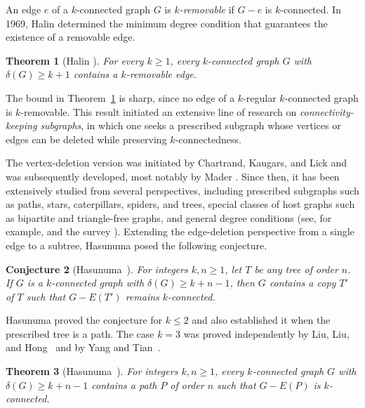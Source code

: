 \documentclass[11pt]{article}
\numberwithin{equation}{section}
\newtheorem{theorem}{Theorem}[section]
\newtheorem{conjecture}[theorem]{Conjecture}
\begin{document}
An edge $e$ of a $k$-connected graph $G$ is \emph{$k$-removable} if $G-e$ is $k$-connected. In 1969, Halin \cite{halin} determined the minimum degree condition that guarantees the existence of a removable edge.

\begin{theorem}[Halin \cite{halin}]\label{thm:halin}
For every $k\ge 1$, every $k$-connected graph $G$ with $\delta(G)\ge k+1$
contains a $k$-removable edge.
\end{theorem}

The bound in Theorem~\ref{thm:halin} is sharp, since no edge of a $k$-regular $k$-connected graph is $k$-removable. 
This result initiated an extensive line of research on \emph{connectivity-keeping subgraphs}, in which one seeks a prescribed subgraph whose vertices or edges can be deleted while preserving $k$-connectedness.

The vertex-deletion version was initiated by Chartrand, Kaugars, and Lick \cite{ckl} and was subsequently developed, most notably by Mader \cite{maderpath,madertree}.
Since then, it has been extensively studied from several perspectives, including prescribed subgraphs such as paths, stars, caterpillars, spiders, and trees, special classes of host graphs such as bipartite and triangle-free graphs, and general degree conditions (see, for example, \cite{fk,ho,lyh,cfp,hl} and the survey \cite{tmsurvey}). 
Extending the edge-deletion perspective from a single edge to a subtree, Hasunuma \cite{hasunuma} posed the following conjecture.


\begin{conjecture}[Hasunuma~\cite{hasunuma}]\label{conj:hasunuma}
For integers $k,n\ge 1$, let $T$ be any tree of order $n$. If $G$ is a
$k$-connected graph with $\delta(G)\ge k+n-1$, then $G$ contains a copy $T'$ of
$T$ such that $G-E(T')$ remains $k$-connected.
\end{conjecture} 

Hasunuma proved the conjecture for $k\le2$ and also established it when the prescribed tree is a path. The case $k=3$ was proved independently by Liu, Liu, and Hong~\cite{llh} and by Yang and Tian~\cite{yt}.

\begin{theorem}[Hasunuma~\cite{hasunuma}]\label{thm:pathbound}
For integers $k,n\ge 1$, every $k$-connected graph $G$ with $\delta(G)\ge k+n-1$
contains a path $P$ of order $n$ such that $G-E(P)$ is $k$-connected.
\end{theorem}
\end{document}

